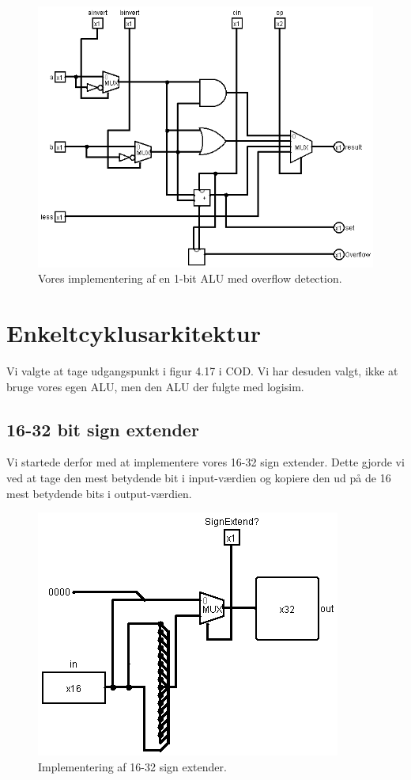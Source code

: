 \documentclass [10pt,a4paper]{article}
\begin{document}
\begin{figure}[h!]
  \centering  
    \includegraphics[scale=0.7]{ALUoverflow.png}
  \caption{Vores implementering af en 1-bit ALU med overflow detection.}
\end{figure}

\section*{Enkeltcyklusarkitektur}
Vi valgte at tage udgangspunkt i figur 4.17 i COD. Vi har desuden
valgt, ikke at bruge vores egen ALU, men den ALU der fulgte med
logisim.

\subsection*{16-32 bit sign extender}
Vi startede derfor med at implementere vores 16-32 sign
extender. Dette gjorde vi ved at tage den mest betydende bit i
input-værdien og kopiere den ud på de 16 mest betydende bits i
output-værdien.

\begin{figure}[h!]
  \centering  
    \includegraphics[scale=0.7]{bitextender.png}
  \caption{Implementering af 16-32 sign extender.}
\end{figure}
\end{document}
